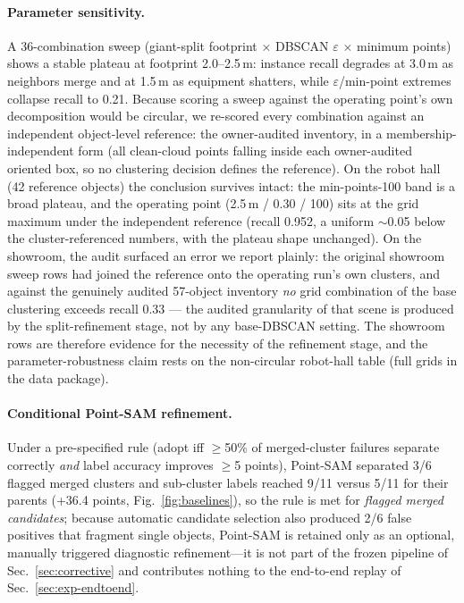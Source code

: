 \paragraph{Parameter sensitivity.}
A 36-combination sweep (giant-split footprint $\times$ DBSCAN
$\varepsilon$ $\times$ minimum points) shows a stable plateau
at footprint 2.0--2.5\,m: instance recall degrades at 3.0\,m as neighbors
merge and at 1.5\,m as equipment shatters, while
$\varepsilon$/min-point extremes collapse recall to 0.21. Because scoring
a sweep against the operating point's own decomposition would be
circular, we re-scored every combination against an independent
object-level reference: the owner-audited inventory, in a
membership-independent form (all clean-cloud points falling inside each
owner-audited oriented box, so no clustering decision defines the
reference). On the robot hall (42 reference objects) the conclusion
survives intact: the min-points-100 band is a broad plateau, and the
operating point (2.5\,m / 0.30 / 100) sits at the grid maximum under
the independent reference (recall 0.952, a uniform $\sim$0.05 below the
cluster-referenced numbers, with the plateau shape unchanged). On the
showroom, the audit surfaced an error we report plainly: the original
showroom sweep rows had joined the reference onto the operating run's
own clusters, and against the genuinely audited 57-object inventory
\emph{no} grid combination of the base clustering exceeds recall 0.33
--- the audited granularity of that scene is produced by the
split-refinement stage, not by any base-DBSCAN setting. The showroom
rows are therefore evidence for the necessity of the refinement stage,
and the parameter-robustness claim rests on the non-circular robot-hall
table (full grids in the data package).

\paragraph{Conditional Point-SAM refinement.}
Under a pre-specified rule (adopt iff $\geq$50\% of merged-cluster failures
separate correctly \emph{and} label accuracy improves $\geq$5 points),
Point-SAM separated 3/6 flagged merged clusters and sub-cluster labels
reached 9/11 versus 5/11 for their parents (+36.4 points,
Fig.~\ref{fig:baselines}), so the rule is met for \emph{flagged merged
candidates}; because automatic candidate selection also produced 2/6
false positives that fragment single objects, Point-SAM is retained only
as an optional, manually triggered diagnostic refinement---it is not part
of the frozen pipeline of Sec.~\ref{sec:corrective} and contributes
nothing to the end-to-end replay of Sec.~\ref{sec:exp-endtoend}.


